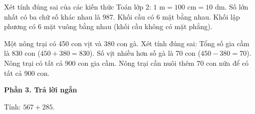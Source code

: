 \begin{ex} %
Xét tính đúng sai của các kiến thức Toán lớp 2:
\choiceTF
{\True $1\text{ m} = 100\text{ cm} = 10\text{ dm}$.}
{\True Số lớn nhất có ba chữ số khác nhau là 987.}
{Khối cầu có 6 mặt bằng nhau.}
{\True Khối lập phương có 6 mặt vuông bằng nhau (khối cầu không có mặt phẳng).}
\end{ex}

\begin{ex} %
Một nông trại có 450 con vịt và 380 con gà. Xét tính đúng sai:
\choiceTF
{\True Tổng số gia cầm là 830 con ($450 + 380 = 830$).}
{\True Số vịt nhiều hơn số gà là 70 con ($450 - 380 = 70$).}
{Nông trại có tất cả 900 con gia cầm.}
{\True Nông trại cần nuôi thêm 70 con nữa để có tất cả 900 con.}
\end{ex}

\textbf{Phần 3. Trả lời ngắn}

\begin{ex} %
Tính: $567 + 285$.
\end{ex}

